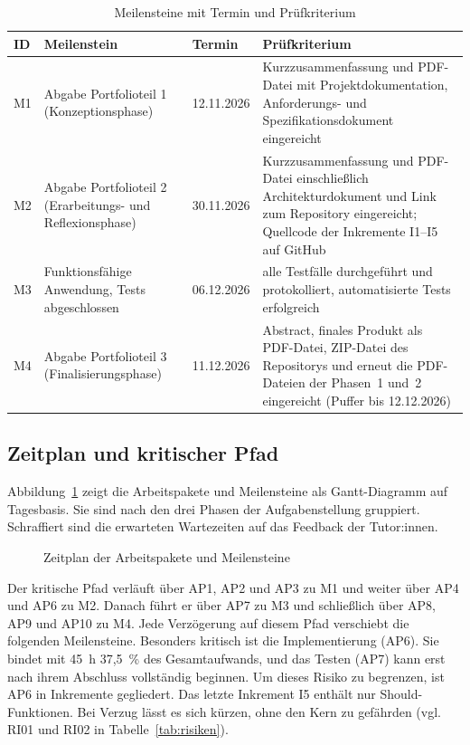 \begin{table}[H]
  \caption{Meilensteine mit Termin und Prüfkriterium}\label{tab:meilensteine}
  \fontsize{10pt}{12pt}\selectfont
  \begin{tabular}{@{}L{0.9cm}L{4.6cm}L{2.0cm}L{8.2cm}@{}}
    \toprule
    \textbf{ID} & \textbf{Meilenstein} & \textbf{Termin} & \textbf{Prüfkriterium} \\
    \midrule
    M1 & Abgabe Portfolioteil 1 (Konzeptionsphase) & 12.11.2026 & Kurzzusammenfassung und PDF-Datei mit Projektdokumentation, Anforderungs- und Spezifikationsdokument eingereicht \\
    M2 & Abgabe Portfolioteil 2 (Erarbeitungs- und Reflexionsphase) & 30.11.2026 & Kurzzusammenfassung und PDF-Datei einschließlich Architekturdokument und Link zum Repository eingereicht; Quellcode der Inkremente I1--I5 auf GitHub \\
    M3 & Funktionsfähige Anwendung, Tests abgeschlossen & 06.12.2026 & alle Testfälle durchgeführt und protokolliert, automatisierte Tests erfolgreich \\
    M4 & Abgabe Portfolioteil 3 (Finalisierungsphase) & 11.12.2026 & Abstract, finales Produkt als PDF-Datei, ZIP-Datei des Repositorys und erneut die PDF-Dateien der Phasen~1 und~2 eingereicht (Puffer bis 12.12.2026) \\
    \bottomrule
  \end{tabular}
\end{table}

\subsection{Zeitplan und kritischer Pfad}
Abbildung~\ref{abb:zeitplan} zeigt die Arbeitspakete und Meilensteine als Gantt-Diagramm auf Tagesbasis. Sie sind nach den drei Phasen der Aufgabenstellung gruppiert. Schraffiert sind die erwarteten Wartezeiten auf das Feedback der Tutor:innen.

\begin{figure}[H]
  \caption{Zeitplan der Arbeitspakete und Meilensteine}\label{abb:zeitplan}
  \centering
\end{figure}

Der kritische Pfad verläuft über AP1, AP2 und AP3 zu M1 und weiter über AP4 und AP6 zu M2. Danach führt er über AP7 zu M3 und schließlich über AP8, AP9 und AP10 zu M4. Jede Verzögerung auf diesem Pfad verschiebt die folgenden Meilensteine. Besonders kritisch ist die Implementierung (AP6). Sie bindet mit 45~h 37,5~\% des Gesamtaufwands, und das Testen (AP7) kann erst nach ihrem Abschluss vollständig beginnen. Um dieses Risiko zu begrenzen, ist AP6 in Inkremente gegliedert. Das letzte Inkrement I5 enthält nur Should-Funktionen. Bei Verzug lässt es sich kürzen, ohne den Kern zu gefährden (vgl. RI01 und RI02 in Tabelle~\ref{tab:risiken}).

